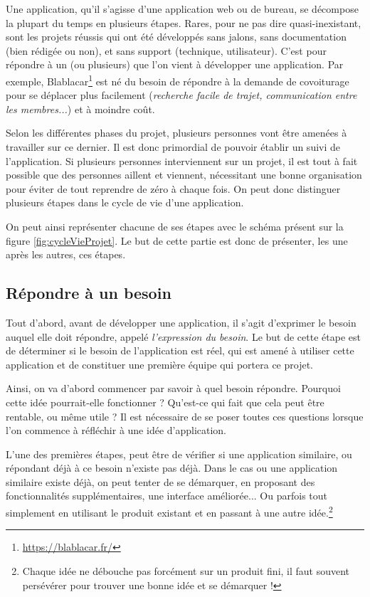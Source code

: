 
Une application, qu'il s'agisse d'une application web ou de bureau, se décompose la plupart du temps en plusieurs étapes. Rares, pour ne pas dire quasi-inexistant, sont les projets réussis qui ont été développés sans jalons, sans documentation (bien rédigée ou non), et sans support (technique, utilisateur). C'est pour répondre à un (ou plusieurs) que l'on vient à développer une application. Par exemple, Blablacar\footnote{\url{https://blablacar.fr/}} est né du besoin de répondre à la demande de covoiturage pour se déplacer plus facilement (\emph{recherche facile de trajet, communication entre les membres...}) et à moindre coût.

Selon les différentes phases du projet, plusieurs personnes vont être amenées à travailler sur ce dernier. Il est donc primordial de pouvoir établir un suivi de l'application. Si plusieurs personnes interviennent sur un projet, il est tout à fait possible que des personnes aillent et viennent, nécessitant une bonne organisation pour éviter de tout reprendre de zéro à chaque fois. On peut donc distinguer plusieurs étapes dans le cycle de vie d'une application.

On peut ainsi représenter chacune de ses étapes avec le schéma présent sur la figure \ref{fig:cycleVieProjet}. Le but de cette partie est donc de présenter, les une après les autres, ces étapes.


\subsection{Répondre à un besoin}

Tout d'abord, avant de développer une application, il s'agit d'exprimer le besoin auquel elle doit répondre, appelé \emph{l'expression du besoin}. Le but de cette étape est de déterminer si le besoin de l'application est réel, qui est amené à utiliser cette application et de constituer une première équipe qui portera ce projet.

Ainsi, on va d'abord commencer par savoir à quel besoin répondre. Pourquoi cette idée pourrait-elle fonctionner ? Qu'est-ce qui fait que cela peut être rentable, ou même utile ? Il est nécessaire de se poser toutes ces questions lorsque l'on commence à réfléchir à une idée d'application.

L'une des premières étapes, peut être de vérifier si une application similaire, ou répondant déjà à ce besoin n'existe pas déjà. Dans le cas ou une application similaire existe déjà, on peut tenter de se démarquer, en proposant des fonctionnalités supplémentaires, une interface améliorée... Ou parfois tout simplement en utilisant le produit existant et en passant à une autre idée.\footnote{Chaque idée ne débouche pas forcément sur un produit fini, il faut souvent persévérer pour trouver une bonne idée et se démarquer !}


